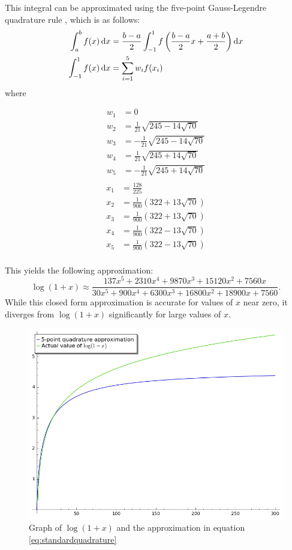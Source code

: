 This integral can be approximated using the five-point Gauss-Legendre quadrature rule \cite{kythe_quadrature_2002}, which is as follows:
\begin{align*}
	\int_a^b{f(x)\mathop{}\!\mathrm{d} x}
	&= \frac{b-a}{2}\int_{-1}^{1}{f\left(\frac{b-a}{2}x+\frac{a+b}{2}\right)\mathop{}\!\mathrm{d} x}\\
	\int_{-1}^{1}{f(x)\mathop{}\!\mathrm{d} x} &= \sum_{i=1}^{5}{w_if(x_i)}
\end{align*}
where
\begin{multicols}{2}
	\noindent
	\begin{align*}
		w_1 &= 0\\
		w_2 &= \frac{1}{21}\sqrt{245-14\sqrt{70}}\\
		w_3 &= -\frac{1}{21}\sqrt{245-14\sqrt{70}}\\
		w_4 &= \frac{1}{21}\sqrt{245+14\sqrt{70}}\\
		w_5 &= -\frac{1}{21}\sqrt{245+14\sqrt{70}}\\
	\end{align*}
	\columnbreak
	\begin{align*}
		x_1 &= \frac{128}{225}\\
		x_2 &= \frac{1}{900}\left( 322 + 13\sqrt{70}\right)\\
		x_3 &= \frac{1}{900}\left( 322 + 13\sqrt{70}\right)\\
		x_4 &= \frac{1}{900}\left( 322 - 13\sqrt{70}\right)\\
		x_5 &= \frac{1}{900}\left( 322 - 13\sqrt{70}\right)\\
	\end{align*}
\end{multicols}
This yields the following approximation:
\begin{equation}\label{eq:standardquadrature}
  \log(1+x) \approx
  \frac{137x^5 + 2310x^4 + 9870x^3 + 15120x^2 + 7560x}
  {30x^5 + 900x^4 + 6300x^3 + 16800x^2 + 18900x + 7560}.
\end{equation}
While this closed form approximation is accurate for values of $x$ near zero, it diverges from $\log{(1+x)}$ significantly for large values of $x$.
\begin{figure}[!ht]
    \centering
    \includegraphics[width=.8\linewidth]{figures/StandardQuadrature.png}
    \caption{Graph of $\log{(1+x)}$ and the approximation in equation \ref{eq:standardquadrature}}
    \label{fig:standardquadrature}
\end{figure}
